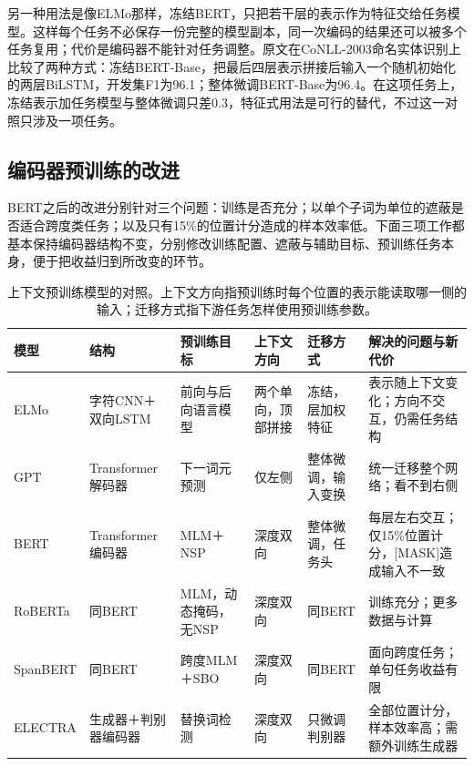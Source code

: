 另一种用法是像ELMo那样，冻结BERT，只把若干层的表示作为特征交给任务模型。这样每个任务不必保存一份完整的模型副本，同一次编码的结果还可以被多个任务复用；代价是编码器不能针对任务调整。原文在CoNLL-2003命名实体识别上比较了两种方式：冻结BERT-Base，把最后四层表示拼接后输入一个随机初始化的两层BiLSTM，开发集F1为96.1；整体微调BERT-Base为96.4。在这项任务上，冻结表示加任务模型与整体微调只差0.3，特征式用法是可行的替代，不过这一对照只涉及一项任务。

\subsection{编码器预训练的改进}
\label{sec:nlp-classical-encoder-improvements}

BERT之后的改进分别针对三个问题：训练是否充分；以单个子词为单位的遮蔽是否适合跨度类任务；以及只有15\%的位置计分造成的样本效率低。下面三项工作都基本保持编码器结构不变，分别修改训练配置、遮蔽与辅助目标、预训练任务本身，便于把收益归到所改变的环节。

\begin{table}[htbp]
  \begin{tabularx}{\linewidth}{@{}>{\raggedright\arraybackslash}p{16mm}>{\raggedright\arraybackslash}p{24mm}>{\raggedright\arraybackslash}p{33mm}>{\raggedright\arraybackslash}p{20mm}>{\raggedright\arraybackslash}p{20mm}>{\raggedright\arraybackslash}X@{}}
    \toprule
    模型 & 结构 & 预训练目标 & 上下文方向 & 迁移方式 & 解决的问题与新代价\\
    \midrule
    ELMo & 字符CNN＋双向LSTM & 前向与后向语言模型 & 两个单向，顶部拼接 & 冻结，层加权特征 & 表示随上下文变化；方向不交互，仍需任务结构\\
    GPT & Transformer解码器 & 下一词元预测 & 仅左侧 & 整体微调，输入变换 & 统一迁移整个网络；看不到右侧\\
    BERT & Transformer编码器 & MLM＋NSP & 深度双向 & 整体微调，任务头 & 每层左右交互；仅15\%位置计分，[MASK]造成输入不一致\\
    RoBERTa & 同BERT & MLM，动态掩码，无NSP & 深度双向 & 同BERT & 训练充分；更多数据与计算\\
    SpanBERT & 同BERT & 跨度MLM＋SBO & 深度双向 & 同BERT & 面向跨度任务；单句任务收益有限\\
    ELECTRA & 生成器＋判别器编码器 & 替换词检测 & 深度双向 & 只微调判别器 & 全部位置计分，样本效率高；需额外训练生成器\\
    \bottomrule
  \end{tabularx}
  \caption{上下文预训练模型的对照。上下文方向指预训练时每个位置的表示能读取哪一侧的输入；迁移方式指下游任务怎样使用预训练参数。}
  \label{tab:nlp-classical-pretraining-models}
\end{table}

